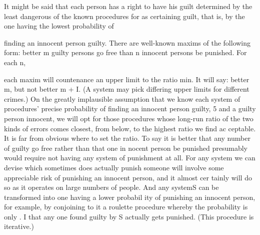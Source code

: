 \documentclass[11pt,openany]{book}
\begin{document}
It might be said that each person has a right to have his guilt determined by the least dangerous of the known procedures for as certaining guilt, that is, by the one having the lowest probability of 

finding an innocent person guilty. There are well-known maxims of the following form: better m guilty persons go free than n innocent persons be punished. For each n, 

each maxim will countenance an upper limit to the ratio min. It will say: better m, but not better m + I. (A system may pick differing upper limits for different crimes.) On the greatly implausible assumption that we know each system of procedures' precise probability of finding an innocent person guilty, 5 and a guilty person innocent, we will opt for those procedures whose long-run ratio of the two kinds of errors comes closest, from below, to the highest ratio we find ac ceptable. It is far from obvious where to set the ratio. To say it is better that any number of guilty go free rather than that one in nocent person be punished presumably would require not having any system of punishment at all. For any system we can devise which sometimes does actually punish someone will involve some appreciable risk of punishing an innocent person, and it almost cer tainly will do so as it operates on large numbers of people. And any systemS can be transformed into one having a lower probabil ity of punishing an innocent person, for example, by conjoining to it a roulette procedure whereby the probability is only . I that any one found guilty by S actually gets punished. (This procedure is iterative.) 
\end{document}

